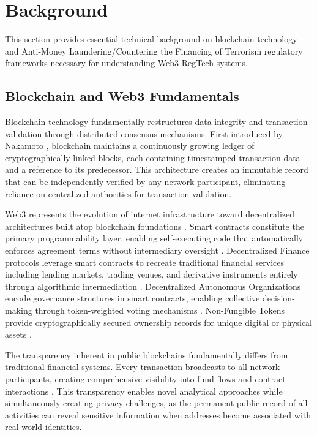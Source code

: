 \section{Background}

This section provides essential technical background on blockchain technology and Anti-Money Laundering/Countering the Financing of Terrorism regulatory frameworks necessary for understanding Web3 RegTech systems.

\subsection{Blockchain and Web3 Fundamentals}

Blockchain technology fundamentally restructures data integrity and transaction validation through distributed consensus mechanisms. First introduced by Nakamoto \cite{nakamoto2008bitcoinpeertopeerelectronic}, blockchain maintains a continuously growing ledger of cryptographically linked blocks, each containing timestamped transaction data and a reference to its predecessor. This architecture creates an immutable record that can be independently verified by any network participant, eliminating reliance on centralized authorities for transaction validation.

Web3 represents the evolution of internet infrastructure toward decentralized architectures built atop blockchain foundations \cite{wood2014ethereumsecuredecentralised}. Smart contracts constitute the primary programmability layer, enabling self-executing code that automatically enforces agreement terms without intermediary oversight \cite{szabo1997formalizingsecuringrelationships}. Decentralized Finance protocols leverage smart contracts to recreate traditional financial services including lending markets, trading venues, and derivative instruments entirely through algorithmic intermediation \cite{harvey2021defifuturefinance}. Decentralized Autonomous Organizations encode governance structures in smart contracts, enabling collective decision-making through token-weighted voting mechanisms \cite{voshmgir2020tokeneconomyhow}. Non-Fungible Tokens provide cryptographically secured ownership records for unique digital or physical assets \cite{wang2021nonfungibletokennft}.

The transparency inherent in public blockchains fundamentally differs from traditional financial systems. Every transaction broadcasts to all network participants, creating comprehensive visibility into fund flows and contract interactions \cite{narayanan2016bitcoincryptocurrencytechnologies}. This transparency enables novel analytical approaches while simultaneously creating privacy challenges, as the permanent public record of all activities can reveal sensitive information when addresses become associated with real-world identities.

